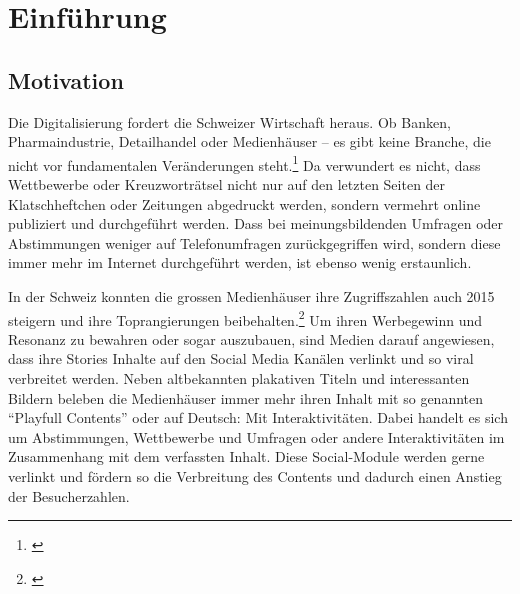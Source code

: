 




\makeatletter
\def\maxwidth{\ifdim\Gin@nat@width>\linewidth\linewidth
\else\Gin@nat@width\fi}
\makeatother
\let\Oldincludegraphics\includegraphics
\renewcommand{\includegraphics}[1]{\Oldincludegraphics[width=\maxwidth]{#1}}

\VerbatimFootnotes

\setlength{\parindent}{0pt}
\setlength{\parskip}{6pt plus 2pt minus 1pt}
\setlength{\emergencystretch}{3em}  %
\providecommand{\tightlist}{%
  \setlength{\itemsep}{0pt}\setlength{\parskip}{0pt}}
\VerbatimFootnotes %




\setcounter{page}{1}


\tableofcontents
\newpage

\chapter{Einführung}\label{einfuxfchrung}

\section{Motivation}\label{motivation}

Die Digitalisierung fordert die Schweizer Wirtschaft heraus. Ob Banken,
Pharmaindustrie, Detailhandel oder Medienhäuser -- es gibt keine
Branche, die nicht vor fundamentalen Veränderungen steht.\footnote{\autocite{digitalerevolutionhz}}
Da verwundert es nicht, dass Wettbewerbe oder Kreuzworträtsel nicht nur
auf den letzten Seiten der Klatschheftchen oder Zeitungen abgedruckt
werden, sondern vermehrt online publiziert und durchgeführt werden. Dass
bei meinungsbildenden Umfragen oder Abstimmungen weniger auf
Telefonumfragen zurückgegriffen wird, sondern diese immer mehr im
Internet durchgeführt werden, ist ebenso wenig erstaunlich.

In der Schweiz konnten die grossen Medienhäuser ihre Zugriffszahlen auch
2015 steigern und ihre Toprangierungen beibehalten.\footnote{\autocite{netmatrixaudit}}
Um ihren Werbegewinn und Resonanz zu bewahren oder sogar auszubauen,
sind Medien darauf angewiesen, dass ihre Stories Inhalte auf den Social
Media Kanälen verlinkt und so viral verbreitet werden. Neben
altbekannten plakativen Titeln und interessanten Bildern beleben die
Medienhäuser immer mehr ihren Inhalt mit so genannten ``Playfull
Contents'' oder auf Deutsch: Mit Interaktivitäten. Dabei handelt es sich
um Abstimmungen, Wettbewerbe und Umfragen oder andere Interaktivitäten
im Zusammenhang mit dem verfassten Inhalt. Diese Social-Module werden
gerne verlinkt und fördern so die Verbreitung des Contents und dadurch
einen Anstieg der Besucherzahlen.


